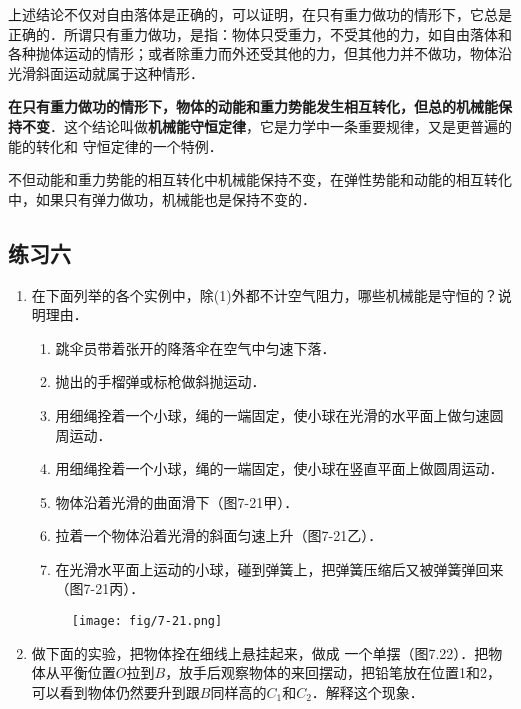 上述结论不仅对自由落体是正确的，可以证明，在只有重力做功的情形下，它总是正确的．所谓只有重力做功，是指：物体只受重力，不受其他的力，如自由落体和各种抛体运动的情形；或者除重力而外还受其他的力，但其他力并不做功，物体沿光滑斜面运动就属于这种情形．

\textbf{在只有重力做功的情形下，物体的动能和重力势能发生相互转化，但总的机械能保持不变}．这个结论叫做\textbf{机械能守恒定律}，它是力学中一条重要规律，又是更普遍的能的转化和
守恒定律的一个特例．

不但动能和重力势能的相互转化中机械能保持不变，在弹性势能和动能的相互转化中，如果只有弹力做功，机械能也是保持不变的．

\subsection*{练习六}
\begin{enumerate}
    \item 在下面列举的各个实例中，除(1)外都不计空气阻力，哪些机械能是守恒的？说明理由．
    \begin{enumerate}[(1)]
        \item 跳伞员带着张开的降落伞在空气中匀速下落．
        \item 抛出的手榴弹或标枪做斜抛运动．
        \item 用细绳拴着一个小球，绳的一端固定，使小球在光滑的水平面上做匀速圆周运动．
        \item 用细绳拴着一个小球，绳的一端固定，使小球在竖直平面上做圆周运动．
        \item 物体沿着光滑的曲面滑下（图7-21甲）．
        \item 拉着一个物体沿着光滑的斜面匀速上升（图7-21乙）．
        \item 在光滑水平面上运动的小球，碰到弹簧上，把弹簧压缩后又被弹簧弹回来（图7-21丙）．
    \end{enumerate}
\begin{figure}[htp]
\centering\texttt{[image: fig/7-21.png]}
\caption{}
\end{figure}

    \item  做下面的实验，把物体拴在细线上悬挂起来，做成
    一个单摆（图7.22）．把物体从平衡位置$O$拉到$B$，放手后观察物体的来回摆动，把铅笔放在位置1和2，可以看到物体仍然要升到跟$B$同样高的$C_1$和$C_2$．解释这个现象．
\begin{figure}[htp]
\centering
{}
\end{figure}
\end{enumerate}
